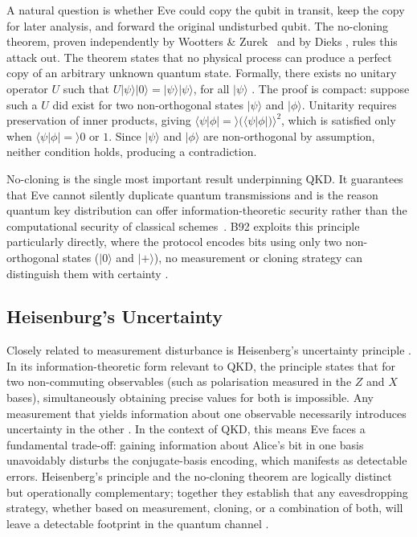 \documentclass[10pt, a4paper]{report}
\newcommand{\ket}[1]{\ensuremath{|#1\rangle}}
\newcommand{\braket}[2]{\ensuremath{\langle#1|#2\rangle}}
\begin{document}
A natural question is whether Eve could copy the qubit in transit, keep the copy for later analysis, and forward the original undisturbed qubit. The no-cloning theorem, proven independently by Wootters \& Zurek~\cite{WZ1982} and by Dieks \cite{Dieks1982}, rules this attack out. The theorem states that no physical process can produce a perfect copy of an arbitrary unknown quantum state. Formally, there exists no unitary operator $U$ such that $U\ket{\psi}\ket{0} = \ket{\psi}\ket{\psi}$, for all $\ket{\psi}$ \cite{QKDbible}. The proof is compact: suppose such a $U$ did exist for two non-orthogonal states $\ket{\psi}$ and $\ket{\phi}$. Unitarity requires preservation of inner products, giving $\braket{\psi|\phi} = (\braket{\psi|\phi})^{2}$, which is satisfied only when $\braket{\psi|\phi} = 0$ or $1$. Since $\ket{\psi}$ and $\ket{\phi}$ are non-orthogonal by assumption, neither condition holds, producing a contradiction.

No-cloning is the single most important result underpinning QKD. It guarantees that Eve cannot silently duplicate quantum transmissions and is the reason quantum key distribution can offer information-theoretic security rather than the computational security of classical schemes~\cite{ekertQI}. B92 exploits this principle particularly directly, where the protocol encodes bits using only two non-orthogonal states ($\ket{0}$ and $\ket{+}$), no measurement or cloning strategy can distinguish them with certainty \cite{B92}.

\subsection{Heisenburg's Uncertainty}

Closely related to measurement disturbance is Heisenberg's uncertainty principle \cite{Heisenberg1927}. In its information-theoretic form relevant to QKD, the principle states that for two non-commuting observables (such as polarisation measured in
the $Z$ and $X$ bases), simultaneously obtaining precise values for both is impossible. Any measurement that yields information about one observable necessarily introduces uncertainty in the other \cite{QKDbible}. In the context of QKD, this means Eve faces a fundamental trade-off: gaining information about Alice's bit in one basis unavoidably disturbs the conjugate-basis encoding, which manifests as detectable errors. Heisenberg's principle and the no-cloning theorem are logically distinct but operationally complementary; together they establish that any eavesdropping strategy, whether based on measurement, cloning, or a combination of both, will leave a detectable footprint in the quantum channel \cite{Scarani2009}. 
\end{document}
